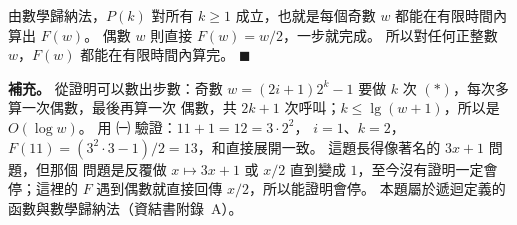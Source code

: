 \begin{pastsoln}
由數學歸納法，$P(k)$ 對所有 $k \ge 1$ 成立，也就是每個奇數 $w$ 都能在有限時間內算出 $F(w)$。 偶數 $w$ 則直接
$F(w) = w/2$，一步就完成。 所以對任何正整數 $w$，$F(w)$ 都能在有限時間內算完。 \hfill$\blacksquare$

\textbf{補充。} 從證明可以數出步數：奇數 $w = (2i+1)2^k - 1$ 要做 $k$ 次 $(*)$，每次多算一次偶數，最後再算一次
偶數，共 $2k + 1$ 次呼叫；$k \le \lg(w + 1)$，所以是 $O(\log w)$。 用 ㈠ 驗證：$11 + 1 = 12 = 3 \cdot 2^2$，
$i = 1$、$k = 2$，$F(11) = (3^2 \cdot 3 - 1)/2 = 13$，和直接展開一致。 這題長得像著名的 $3x + 1$ 問題，但那個
問題是反覆做 $x \mapsto 3x + 1$ 或 $x/2$ 直到變成 $1$，至今沒有證明一定會停；這裡的 $F$ 遇到偶數就直接回傳
$x/2$，所以能證明會停。 本題屬於遞迴定義的函數與數學歸納法（資結書附錄~A）。
\end{pastsoln}
